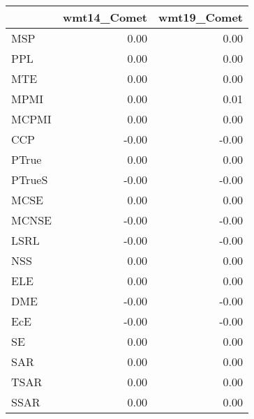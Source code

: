 \begin{tabular}{lrr}
\toprule
 & wmt14\_Comet & wmt19\_Comet \\
\midrule
MSP & 0.00 & 0.00 \\
PPL & 0.00 & 0.00 \\
MTE & 0.00 & 0.00 \\
MPMI & 0.00 & 0.01 \\
MCPMI & 0.00 & 0.00 \\
CCP & -0.00 & -0.00 \\
PTrue & 0.00 & 0.00 \\
PTrueS & -0.00 & -0.00 \\
MCSE & 0.00 & 0.00 \\
MCNSE & -0.00 & -0.00 \\
LSRL & -0.00 & -0.00 \\
NSS & 0.00 & 0.00 \\
ELE & 0.00 & 0.00 \\
DME & -0.00 & -0.00 \\
EcE & -0.00 & -0.00 \\
SE & 0.00 & 0.00 \\
SAR & 0.00 & 0.00 \\
TSAR & 0.00 & 0.00 \\
SSAR & 0.00 & 0.00 \\
\bottomrule
\end{tabular}
